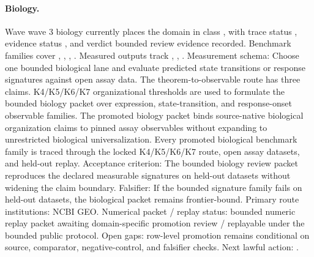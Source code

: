 \paragraph{Biology.}
Wave wave 3 biology currently places the domain in class , with trace status , evidence status , and verdict bounded review evidence recorded.
Benchmark families cover , \allowbreak {}, \allowbreak {}, \allowbreak {}.
Measured outputs track , \allowbreak {}, \allowbreak {}.
Measurement schema: Choose one bounded biological lane and evaluate predicted state transitions or response signatures against open assay data.
The theorem-to-observable route has three claims. K4/K5/K6/K7 organizational thresholds are used to formulate the bounded biology packet over expression, state-transition, and response-onset observable families. The promoted biology packet binds source-native biological organization claims to pinned assay observables without expanding to unrestricted biological universalization. Every promoted biological benchmark family is traced through the locked K4/K5/K6/K7 route, open assay datasets, and held-out replay.
Acceptance criterion: The bounded biology review packet reproduces the declared measurable signatures on held-out datasets without widening the claim boundary.
Falsifier: If the bounded signature family fails on held-out datasets, the biological packet remains frontier-bound.
Primary route institutions: NCBI GEO.
Numerical packet / replay status: bounded numeric replay packet awaiting domain-specific promotion review / replayable under the bounded public protocol.
Open gaps: row-level promotion remains conditional on source, comparator, negative-control, and falsifier checks.
Next lawful action: .

